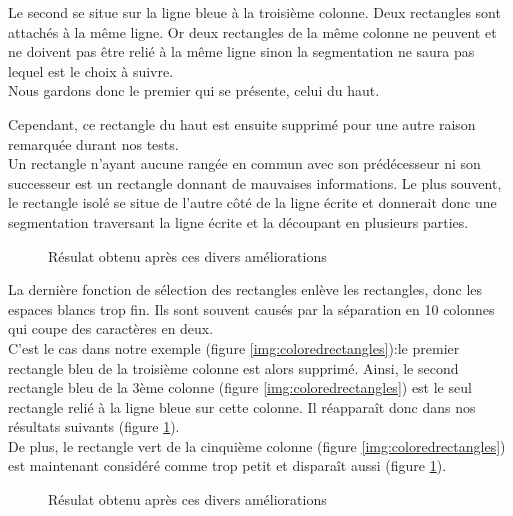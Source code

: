 \documentclass[12pt,a4paper]{article}
\begin{document}
Le second se situe sur la ligne bleue à la troisième colonne. Deux rectangles sont attachés à la même ligne. Or deux rectangles de la même colonne ne peuvent et ne doivent pas être relié à la même ligne sinon la segmentation ne saura pas lequel est le choix à suivre.\\
Nous gardons donc le premier qui se présente, celui du haut.\bigbreak

Cependant, ce rectangle du haut est ensuite supprimé pour une autre raison remarquée durant nos tests.\\
Un rectangle n'ayant aucune rangée en commun avec son prédécesseur ni son successeur est un rectangle donnant de mauvaises informations. Le plus souvent, le rectangle isolé se situe de l'autre côté de la ligne écrite et donnerait donc une segmentation traversant la ligne écrite et la découpant en plusieurs parties.\bigbreak

\begin{figure}[!h]
\centering
    \caption{Résulat obtenu après ces divers améliorations}
\end{figure}

La dernière fonction de sélection des rectangles enlève les rectangles, donc les espaces blancs trop fin. Ils sont souvent causés par la séparation en 10 colonnes qui coupe des caractères en deux.\\
C'est le cas dans notre exemple (figure \ref{img:coloredrectangles}):le premier rectangle bleu de la troisième colonne est alors supprimé. Ainsi, le second rectangle bleu de la 3ème colonne (figure \ref{img:coloredrectangles}) est le seul rectangle relié à la ligne bleue sur cette colonne. Il réapparaît donc dans nos résultats suivants (figure \ref{img:afterthinspacesremoved}).\\
De plus, le rectangle vert de la cinquième colonne (figure \ref{img:coloredrectangles}) est maintenant considéré comme trop petit et disparaît aussi (figure \ref{img:afterthinspacesremoved}).


\begin{figure}[!h]
\centering
    \caption{Résulat obtenu après ces divers améliorations}
    \label{img:afterthinspacesremoved}
\end{figure}
\end{document}

